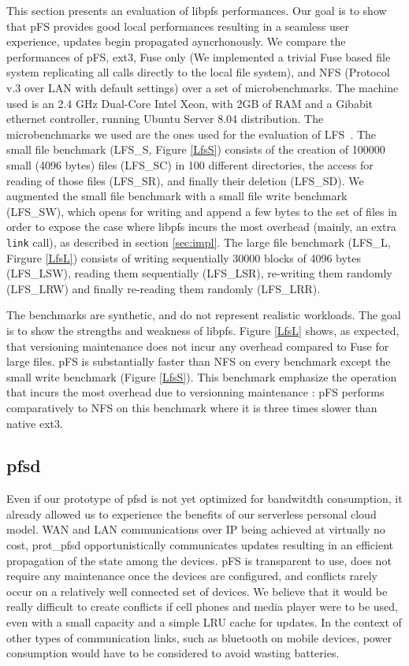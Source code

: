 This section presents an evaluation of libpfs performances. Our goal is
to show that pFS provides good local performances resulting in a
seamless user experience, updates begin propagated ayncrhonously. We
compare the performances of pFS, ext3, Fuse only (We implemented a
trivial Fuse based file system replicating all calls directly to the
local file system), and NFS (Protocol v.3 over LAN with default
settings) over a set of microbenchmarks. The machine used is an 2.4
GHz Dual-Core Intel Xeon, with 2GB of RAM and a Gibabit ethernet
controller, running Ubuntu Server 8.04 distribution. The
microbenchmarks we used are the ones used for the evaluation of
LFS~\cite{rosenblum:lfs}. The small file benchmark (LFS\_S, Figure
\ref{LfsS}) consists of the creation of 100000 small (4096 bytes)
files (LFS\_SC) in 100 different directories, the access for reading
of those files (LFS\_SR), and finally their deletion (LFS\_SD). We
augmented the small file benchmark with a small file write benchmark
(LFS\_SW), which opens for writing and append a few bytes to the set
of files in order to expose the case where libpfs incurs the most
overhead (mainly, an extra {\tt link} call), as described in section
\ref{sec:impl}. The large file benchmark (LFS\_L, Firgure \ref{LfsL})
consists of writing sequentially 30000 blocks of 4096 bytes
(LFS\_LSW), reading them sequentially (LFS\_LSR), re-writing them
randomly (LFS\_LRW) and finally re-reading them randomly (LFS\_LRR).

The benchmarks are synthetic, and do not represent realistic
workloads. The goal is to show the strengths and weakness of
libpfs. Figure \ref{LfsL} shows, as expected, that versioning
maintenance does not incur any overhead compared to Fuse for large
files. pFS is substantially faster than NFS on every benchmark except
the small write benchmark (Figure \ref{LfsS}). This benchmark
emphasize the operation that incurs the most overhead due to
versionning maintenance : pFS performs comparatively to NFS on this
benchmark where it is three times slower than native ext3.

\subsection{pfsd}

Even if our prototype of pfsd is not yet optimized for bandwitdth
consumption, it already allowed us to experience the benefits of our
serverless personal cloud model. WAN and LAN communications over IP
being achieved at virtually no cost, prot\_pfsd opportunistically
communicates updates resulting in an efficient propagation of the
state among the devices. pFS is transparent to use, does not require
any maintenance once the devices are configured, and conflicts rarely
occur on a relatively well connected set of devices. We believe that
it would be really difficult to create conflicts if cell phones and
media player were to be used, even with a small capacity and a simple
LRU cache for updates. In the context of other types of communication
links, such as bluetooth on mobile devices, power consumption would
have to be considered to avoid wasting batteries.


